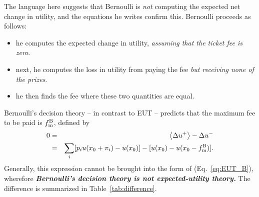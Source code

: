 \documentclass[pdftex]{article}
\newcommand{\ave}[1]{\left\langle#1 \right\rangle}
\newcommand{\bi}{\begin{itemize}}
\newcommand{\ei}{\end{itemize}}
\newcommand{\elabel}[1]{\label{eq:#1}}
\newcommand{\eref}[1]{(Eq.~\ref{eq:#1})}
\newcommand{\tref}[1]{Table~\ref{tab:#1}}
\newcommand{\bea}{\begin{eqnarray}}
\newcommand{\eea}{\end{eqnarray}}
\newcommand{\Du}{\Delta u}
\newcommand{\tmb}{{f_{\text{\normalfont{m}}}^{\text{\normalfont{B}}}}}
\begin{document}
The language here suggests that Bernoulli is {\it not} computing the expected net change in utility, and the equations he writes confirm this. Bernoulli proceeds as follows:
\bi
\item
he computes the expected change in utility, {\it assuming that the ticket fee is zero}.
\item
next, he computes the loss in utility from paying the fee {\it but receiving none of the prizes}.
\item
he then finds the fee where these two quantities are equal.  
\ei 
Bernoulli's decision theory -- in contrast to EUT -- predicts that the maximum fee to be paid is $\tmb$, defined by
\bea
0&=&\ave{\Du^+}-\Du^-\\
&=&\sum_i [p_i u(x_0+\pi_i) -u(x_0)] - [ u(x_0)-u(x_0-\tmb)].
\elabel{ub}
\eea
Generally, this expression cannot be brought into the form of \eref{EUT_B}, wherefore {\it \bf Bernoulli's decision theory is not expected-utility theory.} The difference is summarized in \tref{difference}.
\end{document}
